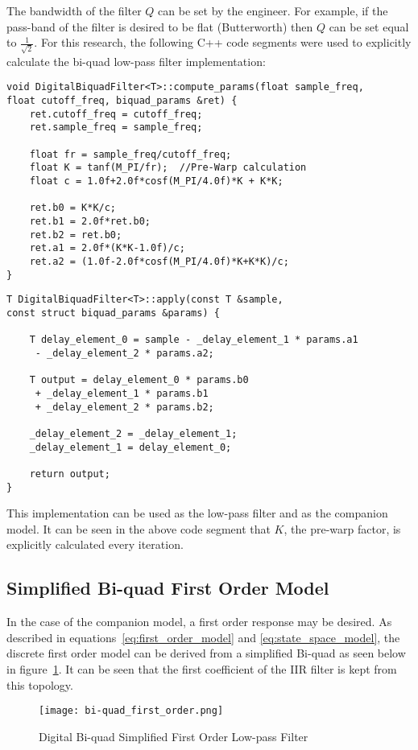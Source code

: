 The bandwidth of the filter $Q$ can be set by the engineer.  For example, if the pass-band of the filter is desired to be flat (Butterworth) then $Q$ can be set equal to $\frac{1}{\sqrt{2}}$.  For this research, the following C++ code segments were used to explicitly calculate the bi-quad low-pass filter implementation: \newline

\begin{lstlisting}
void DigitalBiquadFilter<T>::compute_params(float sample_freq, 
float cutoff_freq, biquad_params &ret) {
    ret.cutoff_freq = cutoff_freq;
    ret.sample_freq = sample_freq;

    float fr = sample_freq/cutoff_freq;
    float K = tanf(M_PI/fr);  //Pre-Warp calculation
    float c = 1.0f+2.0f*cosf(M_PI/4.0f)*K + K*K;

    ret.b0 = K*K/c;
    ret.b1 = 2.0f*ret.b0;
    ret.b2 = ret.b0;
    ret.a1 = 2.0f*(K*K-1.0f)/c;
    ret.a2 = (1.0f-2.0f*cosf(M_PI/4.0f)*K+K*K)/c;
}
\end{lstlisting}

\begin{lstlisting}
T DigitalBiquadFilter<T>::apply(const T &sample, 
const struct biquad_params &params) {
    
    T delay_element_0 = sample - _delay_element_1 * params.a1 
     - _delay_element_2 * params.a2;
    
    T output = delay_element_0 * params.b0 
     + _delay_element_1 * params.b1 
     + _delay_element_2 * params.b2;

    _delay_element_2 = _delay_element_1;
    _delay_element_1 = delay_element_0;

    return output;
}

\end{lstlisting}

This implementation can be used as the \Lone low-pass filter and as the companion model.  It can be seen in the above code segment that $K$, the pre-warp factor, is explicitly calculated every iteration.

\subsection{Simplified Bi-quad First Order Model}

In the case of the companion model, a first order response may be desired.  As described in equations~\ref{eq:first_order_model} and \ref{eq:state_space_model}, the discrete first order model can be derived from a simplified Bi-quad as seen below in figure~\ref{fig:bi-quad_first_order}.  It can be seen that the first coefficient of the \ac{IIR} filter is kept from this topology.
\begin{figure}[h!]
 \centering
  \texttt{[image: bi-quad\_first\_order.png]}
  \caption{Digital Bi-quad Simplified First Order Low-pass Filter }
  \label{fig:bi-quad_first_order}
\end{figure}


